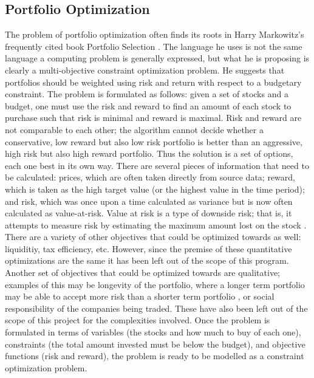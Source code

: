 \documentclass{article}
\begin{document}
    \subsection{Portfolio Optimization}
    The problem of portfolio optimization often finds its roots in Harry Markowitz's frequently cited book Portfolio Selection \cite{Markowitz}.
    The language he uses is not the same language a computing problem is generally expressed, but what he is proposing is clearly a multi-objective 
    constraint optimization problem. He suggests that portfolios should be weighted using risk and return with respect to a budgetary constraint.
    The problem is formulated as follows: given a set of stocks and a budget, one must use the risk and reward to find an amount of each stock to
    purchase such that risk is minimal and reward is maximal. Risk and reward are not comparable to each other; the algorithm cannot decide whether
    a conservative, low reward but also low risk portfolio is better than an aggressive, high risk but also high reward portfolio. Thus the solution is a 
    set of options, each one best in its own way. There are several pieces of information that need to be calculated: prices, which are often taken 
    directly from source data; reward, which is taken as the high target value (or the highest value in the time period); and risk, which was once 
    upon a time calculated as variance but is now often calculated as value-at-risk. Value at risk is a type of downside risk; that is, it attempts 
    to measure risk by estimating the maximum amount lost on the stock \cite{HongHuZhang} \cite{Cid}. There are a variety of other objectives that 
    could be optimized towards as well: liquiditiy, tax efficiency, etc. However, since the premise of these quantitative optimizations are the same 
    it has been left out of the scope of this program. Another set of objectives that could be optimized towards are qualitative; examples of this 
    may be longevity of the portfolio, where a longer term portfolio may be able to accept more risk than a shorter term portfolio \cite{Xiongetal}, 
    or social responsibility of the companies being traded. These have also been left out of the scope of this project for the complexities involved. 
    Once the problem is formulated in terms of variables (the stocks and how much to buy of each one), constraints (the total amount invested must be 
    below the budget), and objective functions (risk and reward), the problem is ready to be modelled as a constraint optimization problem.
\end{document}
